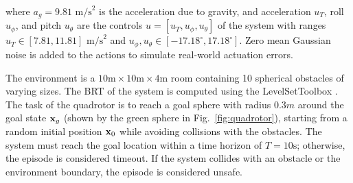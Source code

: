 
where $a_g = 9.81 \text{ m/s}^2$ is the acceleration due to gravity, and acceleration $u_T$, roll $u_\phi$, and pitch $u_\theta$ are the controls $u = [u_T, u_\phi, u_\theta]$ of the system with ranges $u_T \in [7.81, 11.81] \text{ m/s}^2$ and $u_\phi, u_\theta \in [-17.18^{\circ},17.18^{\circ}]$. Zero mean Gaussian noise is added to the actions to simulate real-world actuation errors.

The environment is a $10 \text{m} \times 10 \text{m} \times 4 \text{m}$ room containing 10 spherical obstacles of varying sizes.
The BRT of the system is computed using the LevelSetToolbox \cite{mitchell2004toolbox}.
The task of the quadrotor is to reach a goal sphere with radius $0.3m$ around the goal state $\mathbf{x}_g$ (shown by the green sphere in Fig.~\ref{fig:quadrotor}), starting from a random initial position $\mathbf{x}_0$ while avoiding collisions with the obstacles.
%
The system must reach the goal location within a time horizon of $T = 10\text{s}$; otherwise, the episode is considered timeout.
If the system collides with an obstacle or the environment boundary, the episode is considered unsafe.

